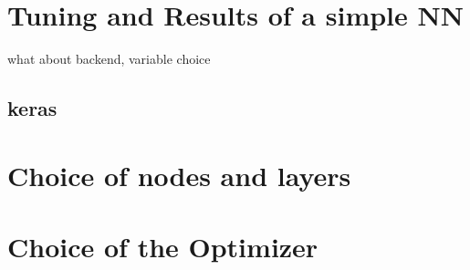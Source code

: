 \section{Tuning and Results of a simple NN}

what about backend, variable choice

\subsection{keras}

\section{Choice of nodes and layers}

\section{Choice of the Optimizer}